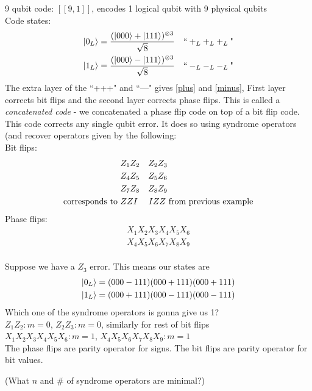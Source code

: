 9 qubit code: $[[9,1]]$, encodes 1 logical qubit with 9 physical qubits \\
Code states:
\begin{align}
    \ket{0_L} &= \frac{(\ket{000} + \ket{111})^{\otimes 3}}{\sqrt{8}} \quad \text{``}+_L+_L+_L \text{"}\\ 
    \ket{1_L} &= \frac{(\ket{000} - \ket{111})^{\otimes 3}} {\sqrt{8}} \quad \text{``}-_L-_L-_L \text{"}
\end{align}
The extra layer of the ``+++" and ``---" gives \eqref{plus} and \eqref{minus}, First layer corrects bit flips and the second layer corrects phase flips. This is called a \textit{concatenated code} - we concatenated a phase flip code on top of a bit flip code. \\
This code corrects any single qubit error. It does so using syndrome operators (and recover operators given by the following: \\
Bit flips: 
\begin{align}
    &Z_1Z_2  \quad Z_2Z_3 \\
    &Z_4Z_5  \quad Z_5Z_6 \\
    &Z_7Z_8  \quad Z_8Z_9 \\
    \text{corresponds to }& ZZI \hspace*{0.45cm} IZZ \text{ from previous example}
\end{align}
Phase flips:
\begin{align}
    X_1X_2X_3X_4X_5X_6 \\
    X_4X_5X_6X_7X_8X_9 \\
\end{align}
\begin{example}
    Suppose we have a $Z_3$ error. This means our states are 
    \begin{align}
        \ket{0_L} &= (000 - 111)(000 + 111)(000 + 111) \\
        \ket{1_L} &= (000 + 111)(000 - 111)(000 - 111) 
    \end{align}
    Which one of the syndrome operators is gonna give us 1? \\
    $Z_1Z_2 : m = 0$, $Z_2Z_3 : m = 0$, similarly for rest of bit flips \\
    $X_1X_2X_3X_4X_5X_6: m = 1$, $X_4X_5X_6X_7X_8X_9: m = 1$ \\
    The phase flips are parity operator for signs. The bit flips are parity operator for bit values. 
\end{example}
(What $n$ and $\#$ of syndrome operators are minimal?) \\
